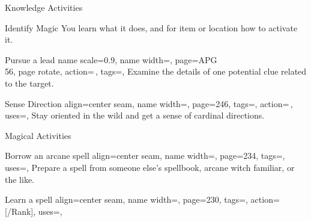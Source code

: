 \begin{PageFront}
\begin{Tables}{\frontTableHeight}
\begin{Table}{Knowledge Activities}
\begin{entry}{Identify Magic}
                You learn what it does, and for item or location how to activate it. \hfill
                \quad\;\,
            \end{entry}
            \breakLine
            \begin{entry}{Pursue a lead}{%
                name scale=0.9,
                name width=\activityLength,%
                page={APG\\\vspace{-0.4ex}56},
                page rotate,
                action=\,,
                tags=\Concentrate\Investigator,
            }
                Examine the details of one potential clue related to the target.
            \end{entry}
            \begin{entry}{Sense Direction}{%
                align=center seam,
                name width=\activityLength,%
                page=246,
                tags=\Concentrate,
                action=\,,
                uses={\Survival[tags=S]},
            }
                Stay oriented in the wild and get a sense of cardinal directions. \hfill
                \\
                \hfill{}
            \end{entry}
        \end{Table}
        \TableSpace
        \begin{Table}{Magical Activities}
            \begin{entry}{Borrow an arcane spell}{%
                align=center seam,
                name width=\activityLength,%
                page=234,
                tags=\Concentrate,
                uses={\Arcana[tags=T]},
            }
                Prepare a spell from someone else's spellbook, arcane witch familiar, or the like. \\
                 \hfill
            \end{entry}
            \begin{entry}{Learn a spell}{%
                align=center seam,
                name width=\activityLength,%
                page=230,
                tags=\Concentrate,
                action=\,[/Rank],
                uses={\MagicalSkill[tags=T]},
}
\end{entry}
\end{Table}
\end{Tables}
\end{PageFront}
